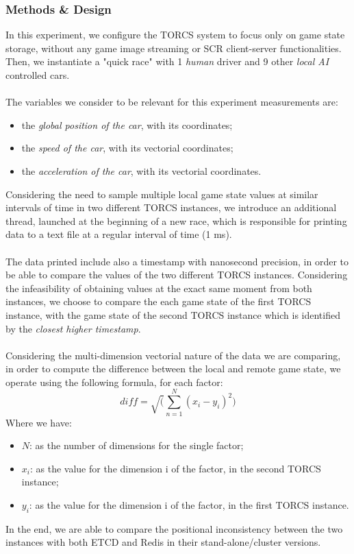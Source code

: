 \subsubsection{Methods \& Design}
In this experiment, we configure the TORCS system to focus only on game state storage, without any game image streaming or SCR client-server functionalities. Then, we instantiate a "quick race" with 1 \textit{human} driver and 9 other \textit{local AI} controlled cars. \\ \\
The variables we consider to be relevant for this experiment measurements are:
\begin{itemize}
	\item the \textit{global position of the car}, with its coordinates;
	\item the \textit{speed of the car}, with its vectorial coordinates;
	\item the \textit{acceleration of the car}, with its vectorial coordinates.
\end{itemize}
Considering the need to sample multiple local game state values at similar intervals of time in two different TORCS instances, we introduce an additional thread, launched at the beginning of a new race, which is responsible for printing data to a text file at a regular interval of time (1 ms). \\ \\
The data printed include also a timestamp with nanosecond precision, in order to be able to compare the values of the two different TORCS instances. Considering the infeasibility of obtaining values at the exact same moment from both instances, we choose to compare the each game state of the first TORCS instance, with the game state of the second TORCS instance which is identified by the \textit{closest higher timestamp}. \\ \\
Considering the multi-dimension vectorial nature of the data we are comparing, in order to compute the difference between the local and remote game state, we operate using the following formula, for each factor:
\[diff = \sqrt(\sum_{n=1}^N (x_i-y_i)^2)\]
Where we have:
\begin{itemize}
	\item $N$: as the number of dimensions for the single factor;
	\item $x_i$: as the value for the dimension {i} of the factor, in the second TORCS instance;
	\item $y_i$: as the value for the dimension {i} of the factor, in the first TORCS instance.
\end{itemize}
In the end, we are able to compare the positional inconsistency between the two instances with both ETCD and Redis in their stand-alone/cluster versions.